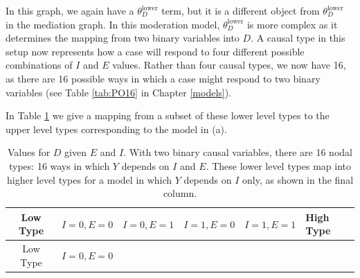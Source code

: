 \documentclass[
  12pt,
]{book}
\begin{document}
In this graph, we again have a \(\theta_D^{\text{lower}}\) term, but it is a different object from \(\theta_D^{\text{lower}}\) in the mediation graph. In this moderation model, \(\theta_D^{\text{lower}}\) is more complex as it determines the mapping from two binary variables into \(D\). A causal type in this setup now represents how a case will respond to four different possible combinations of \(I\) and \(E\) values. Rather than four causal types, we now have 16, as there are 16 possible ways in which a case might respond to two binary variables (see Table \ref{tab:PO16} in Chapter \ref{models}).

In Table \ref{tab:PO16b} we give a mapping from a subset of these lower level types to the upper level types corresponding to the model in (a).

\begin{longtable}[]{@{}cccccl@{}}
\caption{\label{tab:PO16b} Values for \(D\) given \(E\) and \(I\). With two binary causal variables, there are 16 nodal types: 16 ways in which \(Y\) depends on \(I\) and \(E\). These lower level types map into higher level types for a model in which \(Y\) depends on \(I\) only, as shown in the final column.}\tabularnewline
\toprule
\begin{minipage}[b]{0.17\columnwidth}\centering
Low Type\strut
\end{minipage} & \begin{minipage}[b]{0.09\columnwidth}\centering
\(I=0,E=0\)\strut
\end{minipage} & \begin{minipage}[b]{0.09\columnwidth}\centering
\(I=0,E=1\)\strut
\end{minipage} & \begin{minipage}[b]{0.09\columnwidth}\centering
\(I=1,E=0\)\strut
\end{minipage} & \begin{minipage}[b]{0.09\columnwidth}\centering
\(I=1, E=1\)\strut
\end{minipage} & \begin{minipage}[b]{0.30\columnwidth}\raggedright
High Type\strut
\end{minipage}\tabularnewline
\midrule
\endfirsthead
\toprule
\begin{minipage}[b]{0.17\columnwidth}\centering
Low Type\strut
\end{minipage} & \begin{minipage}[b]{0.09\columnwidth}\centering
\(I=0,E=0\)\strut
\end{minipage} & \begin{minipage}[b]{0.09\columnwidth}\centering

\end{minipage}
\end{longtable}
\end{document}
